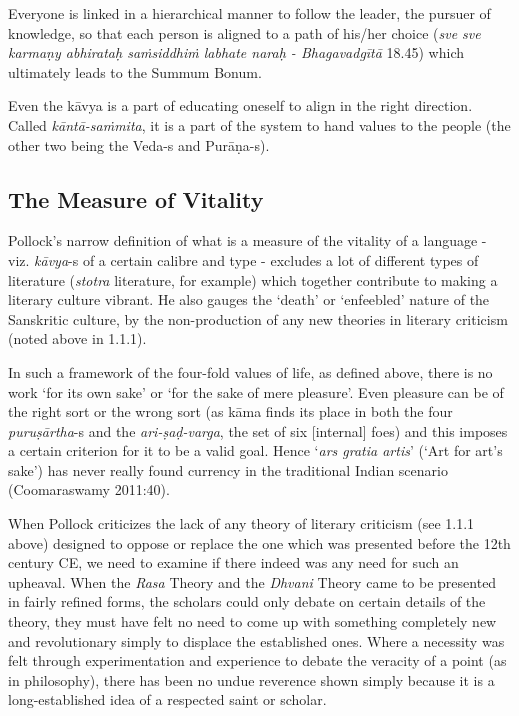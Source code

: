 Everyone is linked in a hierarchical manner to follow the leader, the pursuer of knowledge, so that each person is aligned to a path of his/her choice ({\sl sve sve karmaṇy abhirataḥ saṁsiddhiṁ labhate naraḥ - Bhagavadgītā} 18.45) which ultimately leads to the Summum Bonum. 

Even the kāvya is a part of educating oneself to align in the right direction. Called {\sl kāntā-saṁmita}, it is a part of the system to hand values to the people (the other two being the Veda-s and Purāṇa-s).
\vskip -40pt

\subsection{The Measure of Vitality}
\vskip -5pt

Pollock’s narrow definition of what is a measure of the vitality of a language - viz. {\sl kāvya}-s of a certain calibre and type - excludes a lot of different types of literature ({\sl stotra} literature, for example) which together contribute to making a literary culture vibrant. He also gauges the ‘death’ or ‘enfeebled’ nature of the Sanskritic culture,  by the non-production of any new theories in literary criticism (noted above in 1.1.1).

In such a framework of the four-fold values of life, as defined above, there is no work ‘for its own sake’ or ‘for the sake of mere pleasure’. Even pleasure can be of the right sort or the wrong sort (as kāma finds its place in both the four {\sl puruṣārtha}-s and the {\sl ari-ṣaḍ-varga}, the set of six [internal] foes) and this imposes a certain criterion for it to be a valid goal. Hence ‘{\sl ars gratia artis}’ (‘Art for art’s sake’) has never really found currency in the traditional Indian scenario (Coomaraswamy 2011:40). 

When Pollock criticizes the lack of any theory of literary criticism (see 1.1.1 above) designed to oppose or replace the one which was presented before the 12th century CE, we need to examine if there indeed was any need for such an upheaval. When the {\sl Rasa} Theory and the {\sl Dhvani} Theory came to be presented in fairly refined forms, the scholars could only debate on certain details of the theory, they must have felt no need to come up with something completely new and revolutionary simply to displace the established ones. Where a necessity was felt through experimentation and experience to debate the veracity of a point (as in philosophy), there has been no undue reverence shown simply because it is a long-established idea of a respected saint or scholar.

